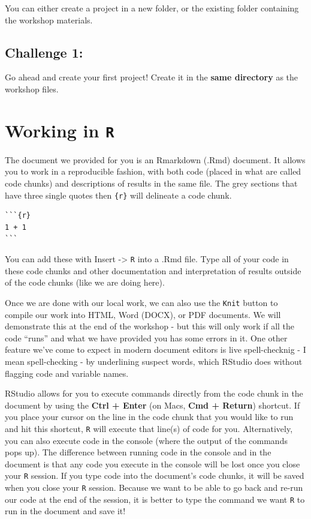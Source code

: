 \documentclass[
  10pt,
  letterpaper,
  twoside,
  openright]{book}
\begin{document}
You can either create a project in a new folder, or the existing folder
containing the workshop materials.

\hypertarget{challenge-1}{%
\subsection{Challenge 1:}\label{challenge-1}}

Go ahead and create your first project! Create it in the \textbf{same
directory} as the workshop files.

\hypertarget{working-in-r}{%
\section{\texorpdfstring{Working in
\texttt{R}}{Working in R}}\label{working-in-r}}

The document we provided for you is an Rmarkdown (.Rmd) document. It
allows you to work in a reproducible fashion, with both code (placed in
what are called code chunks) and descriptions of results in the same
file. The grey sections that have three single quotes then
\texttt{\{r\}} will delineate a code chunk.

\begin{verbatim}
```{r}
1 + 1
```  
\end{verbatim}

You can add these with Insert -\textgreater{} \texttt{R} into a .Rmd
file. Type all of your code in these code chunks and other documentation
and interpretation of results outside of the code chunks (like we are
doing here).

Once we are done with our local work, we can also use the \texttt{Knit}
button to compile our work into HTML, Word (DOCX), or PDF documents. We
will demonstrate this at the end of the workshop - but this will only
work if all the code ``runs'' and what we have provided you has some
errors in it. One other feature we've come to expect in modern document
editors is live spell-checknig - I mean spell-checking - by underlining
suspect words, which RStudio does without flagging code and variable
names.

RStudio allows for you to execute commands directly from the code chunk
in the document by using the \textbf{Ctrl + Enter} (on Macs, \textbf{Cmd
+ Return}) shortcut. If you place your cursor on the line in the code
chunk that you would like to run and hit this shortcut, \texttt{R} will
execute that line(s) of code for you. Alternatively, you can also
execute code in the console (where the output of the commands pops up).
The difference between running code in the console and in the document
is that any code you execute in the console will be lost once you close
your \texttt{R} session. If you type code into the document's code
chunks, it will be saved when you close your \texttt{R} session. Because
we want to be able to go back and re-run our code at the end of the
session, it is better to type the command we want \texttt{R} to run in
the document and save it!
\end{document}
